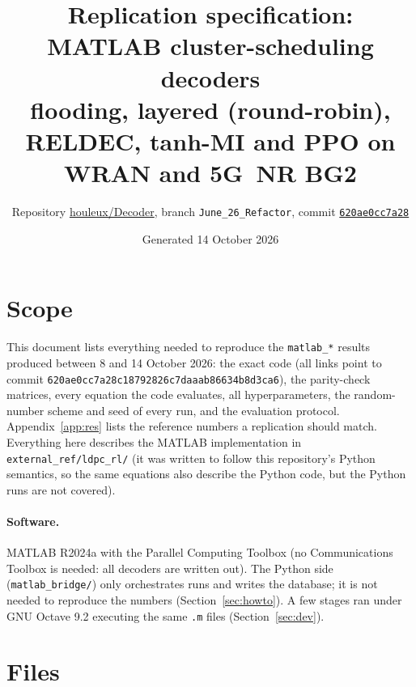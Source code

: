 \documentclass[10pt,a4paper]{article}
\title{Replication specification: MATLAB cluster-scheduling decoders\\[2pt]\large flooding, layered (round-robin), RELDEC, tanh-MI and PPO on WRAN and 5G~NR BG2}
\author{Repository \href{https://github.com/houleux/Decoder}{houleux/Decoder}, branch \texttt{June\_26\_Refactor}, commit \href{https://github.com/houleux/Decoder/tree/620ae0cc7a28c18792826c7daaab86634b8d3ca6}{\texttt{620ae0cc7a28}}}
\date{Generated 14 October 2026}
\begin{document}
\maketitle

\section{Scope}
This document lists everything needed to reproduce the \texttt{matlab\_*} results produced between 8 and 14 October 2026:
the exact code (all links point to commit \texttt{620ae0cc7a28c18792826c7daaab86634b8d3ca6}), the parity-check matrices, every equation the code evaluates,
all hyperparameters, the random-number scheme and seed of every run, and the evaluation protocol. Appendix~\ref{app:res}
lists the reference numbers a replication should match. Everything here describes the MATLAB implementation in
\texttt{external\_ref/ldpc\_rl/} (it was written to follow this repository's Python semantics, so the same equations
also describe the Python code, but the Python runs are not covered).

\paragraph{Software.} MATLAB R2024a with the Parallel Computing Toolbox (no Communications Toolbox is needed: all
decoders are written out). The Python side (\texttt{matlab\_bridge/}) only orchestrates runs and writes the database;
it is not needed to reproduce the numbers (Section~\ref{sec:howto}). A few stages ran under GNU Octave 9.2 executing the
same \texttt{.m} files (Section~\ref{sec:dev}).

\section{Files}
\end{document}
